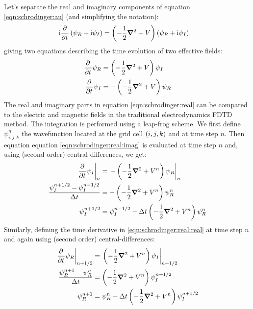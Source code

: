 Let's separate the real and imaginary components of equation
\eqref{eqn:schrodinger:au} (and simplifying the notation):
\begin{align}
\textrm{i} \frac{\partial^{{}}   }{\partial t^{{}}} \left(  \psi_R + \textrm{i} \psi_I \right)
    & = \left( -\frac{1}{2} \bm{\nabla}^2 + V  \right)
        \left(  \psi_R + \textrm{i} \psi_I \right)
\end{align}
giving two equations describing the time evolution of two effective fields:
\begin{subequations}
\begin{align}
\frac{\partial^{{}}   }{\partial t^{{}}} \psi_R & =   \left( -\frac{1}{2} \bm{\nabla}^2 + V  \right) \psi_I
\label{eqn:schrodinger:real:real} \\
\frac{\partial^{{}}   }{\partial t^{{}}} \psi_I & = - \left( -\frac{1}{2} \bm{\nabla}^2 + V  \right) \psi_R
\label{eqn:schrodinger:real:imag}
\end{align}
\label{eqn:schrodinger:real}
\end{subequations}
The real and imaginary parts in equation \eqref{eqn:schrodinger:real} can be
compared to the electric and magnetic fields in the traditional electrodynamics
FDTD method. The integration is performed using a leap-frog scheme. We
first define $\psi_{i,j,k}^{n}$ the wavefunction located at the grid cell
$\left( i,j,k \right)$ and at time step $n$. Then equation equation
\eqref{eqn:schrodinger:real:imag} is evaluated at time step $n$ and, using
(second order) central-differences, we get:
\begin{align}
\left. \frac{\partial^{{}}   }{\partial t^{{}}} \psi_I \right|_{n}
& = \left. - \left( -\frac{1}{2} \bm{\nabla}^2 + V^{n}  \right) \psi_R \right|_{n} \\
\frac{\psi_{I}^{n+1/2} - \psi_{I}^{n-1/2}}{\Delta t}
& = - \left( -\frac{1}{2} \bm{\nabla}^2 + V^{n}  \right) \psi_{R}^{n} \\
\psi_{I}^{n+1/2}
& = \psi_{I}^{n-1/2} - \Delta t \left( -\frac{1}{2} \bm{\nabla}^2 + V^{n}  \right)
\psi_{R}^{n}
\label{eqn:schrodinger:real:imag:discretized}
\end{align}
Similarly, defining the time derivative in \eqref{eqn:schrodinger:real:real} at
time step $n$ and again using (second order) central-differences:
\begin{align}
\left. \frac{\partial^{{}}   }{\partial t^{{}}} \psi_R \right|_{n+1/2}
& = \left. \left( -\frac{1}{2} \bm{\nabla}^2 + V^{n}  \right) \psi_I \right|_{n+1/2} \\
\frac{\psi_{R}^{n+1} - \psi_{R}^{n}}{\Delta t}
& = \left( -\frac{1}{2} \bm{\nabla}^2 + V^{n}  \right) \psi_{I}^{n+1/2} \\
\psi_{R}^{n+1}
& = \psi_{R}^{n} + \Delta t \left( -\frac{1}{2} \bm{\nabla}^2 + V^{n}  \right)
\psi_{I}^{n+1/2}
\label{eqn:schrodinger:real:real:discretized}
\end{align}

